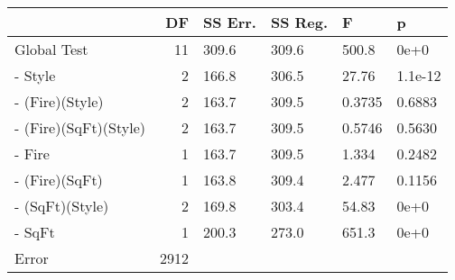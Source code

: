 \begin{tabular}{lrllll}
\toprule
{} &    DF & SS Err. & SS Reg. &      F &       p \\
\midrule
Global Test           &    11 &   309.6 &   309.6 &  500.8 &    0e+0 \\
- Style               &     2 &   166.8 &   306.5 &  27.76 & 1.1e-12 \\
- (Fire)(Style)       &     2 &   163.7 &   309.5 & 0.3735 &  0.6883 \\
- (Fire)(SqFt)(Style) &     2 &   163.7 &   309.5 & 0.5746 &  0.5630 \\
- Fire                &     1 &   163.7 &   309.5 &  1.334 &  0.2482 \\
- (Fire)(SqFt)        &     1 &   163.8 &   309.4 &  2.477 &  0.1156 \\
- (SqFt)(Style)       &     2 &   169.8 &   303.4 &  54.83 &    0e+0 \\
- SqFt                &     1 &   200.3 &   273.0 &  651.3 &    0e+0 \\
Error                 &  2912 &         &         &        &         \\
\bottomrule
\end{tabular}
